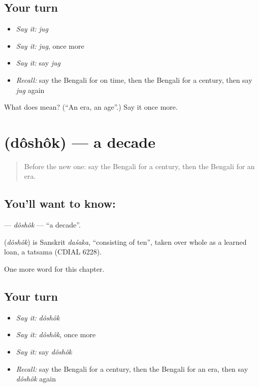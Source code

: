 \subsection*{Your turn}
\begin{itemize}
\raggedright
  \item \emph{Say it:} \emph{jug}
  \item \emph{Say it:} \emph{jug}, once more
  \item \emph{Say it:} say \emph{jug}
  \item \emph{Recall:} say the Bengali for on time, then the Bengali for a century, then say \emph{jug} again
\end{itemize}

\begin{tcolorbox}[breakable,colback=teal!4,colframe=teal!35!black,title={Before you move on}]
What does  mean? (\textquotedblleft{}An era, an age\textquotedblright{}.) Say it once more.
\end{tcolorbox}
\section[\texorpdfstring{\bn{দশক} (dôshôk)}{দশক (dôshôk)}]{ (dôshôk) — a decade}

\label{lesson:BN-C187-doshok}



\begin{quote}
Before the new one: say the Bengali for a century, then the Bengali for an era.
\end{quote}

\subsection*{You'll want to know: }
\textbf{} — \emph{dôshôk} — \textquotedblleft{}a decade\textquotedblright{}.

\begin{cousinweb}
\textbf{} (\emph{dôshôk}) is Sanskrit \emph{daśaka}, \textquotedblleft{}consisting of ten\textquotedblright{}, taken over whole as a learned loan, a tatsama (CDIAL 6228).
\end{cousinweb}

\begin{grammarlens}[title={What you've built}]
One more word for this chapter.
\end{grammarlens}

\subsection*{Your turn}
\begin{itemize}
\raggedright
  \item \emph{Say it:} \emph{dôshôk}
  \item \emph{Say it:} \emph{dôshôk}, once more
  \item \emph{Say it:} say \emph{dôshôk}
  \item \emph{Recall:} say the Bengali for a century, then the Bengali for an era, then say \emph{dôshôk} again
\end{itemize}

